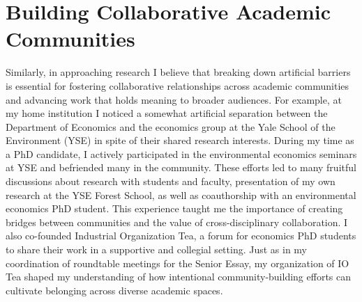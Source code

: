 \documentclass[11pt,letterpaper]{article}
\begin{document}
\section*{Building Collaborative Academic Communities}

Similarly, in approaching research I believe that breaking down artificial barriers is essential for fostering collaborative relationships across academic communities and advancing work that holds meaning to broader audiences. For example, at my home institution I noticed a somewhat artificial separation between the Department of Economics and the economics group at the Yale School of the Environment (YSE) in spite of their shared research interests. During my time as a PhD candidate, I actively participated in the environmental economics seminars at YSE and befriended many in the community. These efforts led to many fruitful discussions about research with students and faculty, presentation of my own research at the YSE Forest School, as well as coauthorship with an environmental economics PhD student. This experience taught me the importance of creating bridges between communities and the value of cross-disciplinary collaboration. I also co-founded Industrial Organization Tea, a forum for economics PhD students to share their work in a supportive and collegial setting. Just as in my coordination of roundtable meetings for the Senior Essay, my organization of IO Tea shaped my understanding of how intentional community-building efforts can cultivate belonging across diverse academic spaces.
\end{document}
